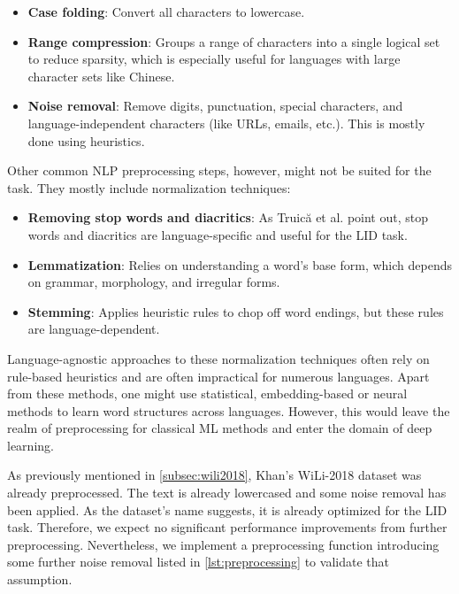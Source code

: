 \begin{itemize}
    \item \textbf{Case folding}: Convert all characters to lowercase.
    \item \textbf{Range compression}: Groups a range of characters into a single logical set to reduce sparsity, which is especially useful for languages with large character sets like Chinese.
    \item \textbf{Noise removal}: Remove digits, punctuation, special characters, and language-independent characters (like URLs, emails, etc.). This is mostly done using heuristics.
\end{itemize}
Other common NLP preprocessing steps, however, might not be suited for the task. They mostly include normalization techniques:

\begin{itemize}
    \item \textbf{Removing stop words and diacritics}: As Truică et al. point out, stop words and diacritics are language-specific and useful for the LID task. \cite{Truic2018}
    \item \textbf{Lemmatization}: Relies on understanding a word's base form, which depends on grammar, morphology, and irregular forms.
    \item \textbf{Stemming}: Applies heuristic rules to chop off word endings, but these rules are language-dependent.
\end{itemize}
Language-agnostic approaches to these normalization techniques often rely on rule-based heuristics and are often impractical for numerous languages. Apart from these methods, one might use statistical, embedding-based or neural methods to learn word structures across languages. However, this would leave the realm of preprocessing for classical ML methods and enter the domain of deep learning.

As previously mentioned in \cref{subsec:wili2018}, Khan's WiLi-2018 dataset was already preprocessed. The text is already lowercased and some noise removal has been applied. As the dataset's name suggests, it is already optimized for the LID task. Therefore, we expect no significant performance improvements from further preprocessing. Nevertheless, we implement a preprocessing function introducing some further noise removal listed in \cref{lst:preprocessing} to validate that assumption.

